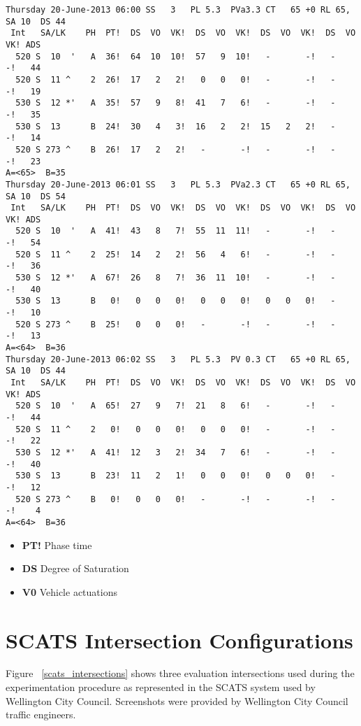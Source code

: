 \begin{appendices}
\begin{verbatim}
Thursday 20-June-2013 06:00 SS   3   PL 5.3  PVa3.3 CT   65 +0 RL 65, SA 10  DS 44
 Int   SA/LK    PH  PT!  DS  VO  VK!  DS  VO  VK!  DS  VO  VK!  DS  VO  VK! ADS
  520 S  10  '   A  36!  64  10  10!  57   9  10!   -       -!   -       -!   44
  520 S  11 ^    2  26!  17   2   2!   0   0   0!   -       -!   -       -!   19
  530 S  12 *'   A  35!  57   9   8!  41   7   6!   -       -!   -       -!   35
  530 S  13      B  24!  30   4   3!  16   2   2!  15   2   2!   -       -!   14
  520 S 273 ^    B  26!  17   2   2!   -       -!   -       -!   -       -!   23
A=<65>  B=35
Thursday 20-June-2013 06:01 SS   3   PL 5.3  PVa2.3 CT   65 +0 RL 65, SA 10  DS 54
 Int   SA/LK    PH  PT!  DS  VO  VK!  DS  VO  VK!  DS  VO  VK!  DS  VO  VK! ADS
  520 S  10  '   A  41!  43   8   7!  55  11  11!   -       -!   -       -!   54
  520 S  11 ^    2  25!  14   2   2!  56   4   6!   -       -!   -       -!   36
  530 S  12 *'   A  67!  26   8   7!  36  11  10!   -       -!   -       -!   40
  530 S  13      B   0!   0   0   0!   0   0   0!   0   0   0!   -       -!   10
  520 S 273 ^    B  25!   0   0   0!   -       -!   -       -!   -       -!   13
A=<64>  B=36
Thursday 20-June-2013 06:02 SS   3   PL 5.3  PV 0.3 CT   65 +0 RL 65, SA 10  DS 44
 Int   SA/LK    PH  PT!  DS  VO  VK!  DS  VO  VK!  DS  VO  VK!  DS  VO  VK! ADS
  520 S  10  '   A  65!  27   9   7!  21   8   6!   -       -!   -       -!   44
  520 S  11 ^    2   0!   0   0   0!   0   0   0!   -       -!   -       -!   22
  530 S  12 *'   A  41!  12   3   2!  34   7   6!   -       -!   -       -!   40
  530 S  13      B  23!  11   2   1!   0   0   0!   0   0   0!   -       -!   12
  520 S 273 ^    B   0!   0   0   0!   -       -!   -       -!   -       -!    4
A=<64>  B=36
\end{verbatim}

\begin{itemize}
\item \textbf{PT!} Phase time
\item \textbf{DS} Degree of Saturation
\item \textbf{V0} Vehicle actuations
\end{itemize}

\chapter{SCATS Intersection Configurations}
\label{appendix:scats_intersections}

Figure ~\ref{scats_intersections} shows three evaluation intersections used during the experimentation procedure as represented in the SCATS system used by Wellington City Council. Screenshots were provided by Wellington City Council traffic engineers.


\end{appendices}

